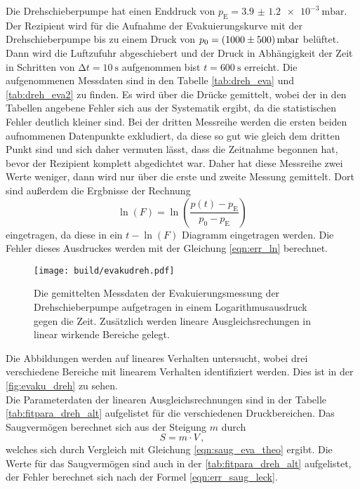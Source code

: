     \noindent Die Drehschieberpumpe hat einen Enddruck von $p_\text{E} = \SI{3.9(12)e-3}{\milli\bar}$. Der Rezipient wird für die Aufnahme der Evakuierungskurve mit der Drehschieberpumpe 
    bis zu einem Druck von $p_0 = \SI{1000 \pm 500}{\milli\bar}$ belüftet. Dann wird die Luftzufuhr abgeschiebert und der Druck in Abhängigkeit der Zeit in 
    Schritten von $\increment t = \SI{10}{\second}$ aufgenommen bist $t = \SI{600}{\second}$ erreicht. Die aufgenommenen Messdaten sind in den Tabelle \ref{tab:dreh_eva} und \ref{tab:dreh_eva2} zu finden. 
    Es wird über die Drücke gemittelt, wobei der in den Tabellen angebene Fehler sich aus der Systematik ergibt, da die statistischen Fehler deutlich kleiner sind.
    Bei der dritten Messreihe werden die ersten beiden aufnommenen Datenpunkte exkludiert, da diese so gut wie gleich dem dritten Punkt sind und sich 
    daher vermuten lässt, dass die Zeitnahme begonnen hat, bevor der Rezipient komplett abgedichtet war. Daher hat diese Messreihe zwei Werte weniger, dann wird nur über die 
    erste und zweite Messung gemittelt.
    Dort sind außerdem die Ergbnisse der Rechnung 
    \begin{equation*}
      \ln(F) = \ln \left( \frac{p(t) - p_\text{E}}{p_0 - p_\text{E}}\right)
    \end{equation*}
    eingetragen, da diese in ein $t - \ln(F)$ Diagramm eingetragen werden. Die Fehler dieses Ausdruckes werden mit der Gleichung \eqref{eqn:err_ln} berechnet.  

    \begin{figure}[h]
      \centering
      \texttt{[image: build/evakudreh.pdf]}
      \caption{Die gemittelten Messdaten der Evakuierungsmessung der Drehschieberpumpe aufgetragen in einem Logarithmusausdruck gegen die Zeit. Zusätzlich werden lineare Ausgleichsrechungen in linear wirkende Bereiche gelegt.}
      \label{fig:evaku_dreh}
    \end{figure}

    \noindent Die Abbildungen werden auf lineares Verhalten untersucht, wobei drei verschiedene Bereiche mit linearem Verhalten identifiziert werden. 
    Dies ist in der \autoref{fig:evaku_dreh} zu sehen.  \\ 
    Die Parameterdaten der linearen Ausgleichsrechnungen sind in der Tabelle \autoref{tab:fitpara_dreh_alt} aufgelistet für die verschiedenen Druckbereichen. Das Saugvermögen berechnet sich 
    aus der Steigung $m$ durch 
    \begin{equation*}
      S = m \cdot V\, ,
    \end{equation*}
    welches sich durch Vergleich mit Gleichung \eqref{eqn:saug_eva_theo} ergibt.
    Die Werte für das Saugvermögen sind auch in der \autoref{tab:fitpara_dreh_alt} aufgelistet, der Fehler berechnet sich nach der Formel \eqref{eqn:err_saug_leck}. 

